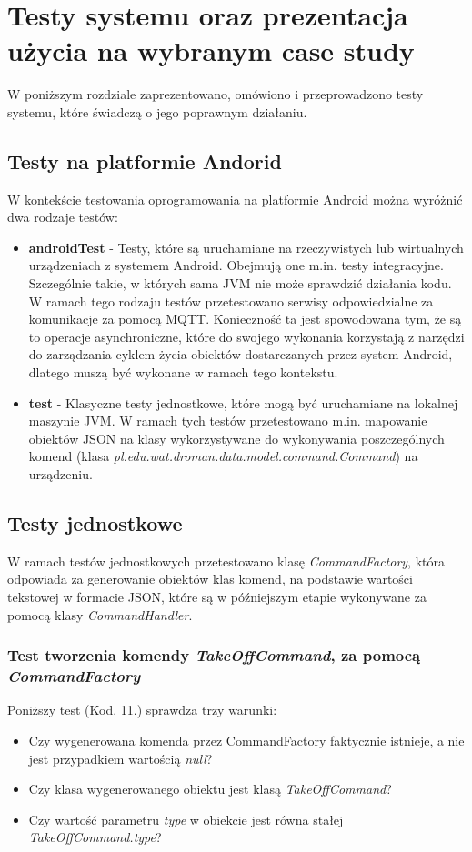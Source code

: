 \clearpage
\newpage
\section{Testy systemu oraz prezentacja użycia na wybranym case study}
W poniższym rozdziale zaprezentowano, omówiono i przeprowadzono testy systemu, które świadczą o jego poprawnym działaniu.

\subsection{Testy na platformie Andorid}

W kontekście testowania oprogramowania na platformie Android można wyróżnić dwa
rodzaje testów:
\begin{itemize} 
  \item \textbf{androidTest} - Testy, które są uruchamiane na rzeczywistych lub wirtualnych urządzeniach z systemem Android. Obejmują one m.in. testy integracyjne. Szczególnie takie, w których sama JVM nie może sprawdzić działania kodu. W ramach tego rodzaju testów przetestowano serwisy odpowiedzialne za komunikacje za pomocą MQTT. Konieczność ta jest spowodowana tym, że są to operacje asynchroniczne, które do swojego wykonania korzystają z narzędzi do zarządzania cyklem życia obiektów dostarczanych przez system Android, dlatego muszą być wykonane w ramach tego kontekstu.
  \item \textbf{test} - Klasyczne testy jednostkowe, które mogą być uruchamiane na lokalnej maszynie JVM. W ramach tych testów przetestowano m.in. mapowanie obiektów JSON na klasy wykorzystywane do wykonywania poszczególnych komend (klasa \textit{pl.edu.wat.droman.data.model.command.Command}) na urządzeniu.
\end{itemize}

\newpage
\subsection{Testy jednostkowe}
W ramach testów jednostkowych przetestowano klasę \textit{CommandFactory}, która odpowiada za generowanie obiektów klas komend, na podstawie wartości tekstowej w formacie JSON, które są w późniejszym etapie wykonywane za pomocą klasy \textit{CommandHandler}.

\subsubsection{Test tworzenia komendy \textit{TakeOffCommand}, za pomocą \textit{CommandFactory}}
Poniższy test (Kod. 11.) sprawdza trzy warunki: 
\begin{itemize}
  \item Czy wygenerowana komenda przez CommandFactory faktycznie istnieje, a nie jest przypadkiem wartością \textit{null}?
  \item Czy klasa wygenerowanego obiektu jest klasą \textit{TakeOffCommand}?
  \item Czy wartość parametru \textit{type} w obiekcie jest równa stałej \textit{TakeOffCommand.type}?
\end{itemize}

